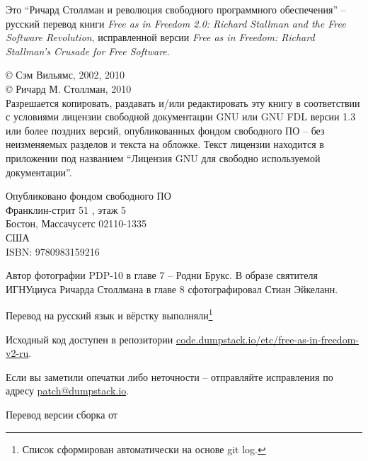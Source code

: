 \thispagestyle{plain}

\noindent Это \enquote{Ричард Столлман и революция свободного программного обеспечения} -- русский перевод книги \textit{Free as in Freedom 2.0: Richard Stallman and the Free Software Revolution}, исправленной версии \textit{Free as in Freedom: Richard Stallman's Crusade for Free Software}.

\bigskip

\noindent \copyright{} Сэм Вильямс, 2002, 2010\\
\copyright{} Ричард М. Столлман, 2010\\

Разрешается копировать, раздавать и/или редактировать эту книгу в соответствии с условиями лицензии свободной документации GNU или GNU FDL версии 1.3 или более поздних версий, опубликованных фондом свободного ПО -- без неизменяемых разделов и текста на обложке. Текст лицензии находится в приложении под названием \enquote{Лицензия GNU для свободно используемой документации}.

\bigskip

\noindent Опубликовано фондом свободного ПО\\
Франклин-стрит 51 , этаж 5\\
Бостон, Массачусетс 02110-1335\\
США\\
ISBN: 9780983159216\\

\bigskip

\noindent Автор фотографии PDP-10 в главе 7 -- Родни Брукс. В образе святителя ИГНУциуса Ричарда Столлмана в главе 8 сфотографировал Стиан Эйкеланн.

\bigskip

Перевод на русский язык и вёрстку выполняли\footnote{Список сформирован автоматически на основе git log.} 

Исходный код доступен в репозитории
\href{https://code.dumpstack.io/etc/free-as-in-freedom-v2-ru}{code.dumpstack.io/etc/free-as-in-freedom-v2-ru}.

Если вы заметили опечатки либо неточности -- отправляйте исправления по адресу
\href{mailto:patch@dumpstack.io}{patch@dumpstack.io}.

Перевод версии  сборка от 
